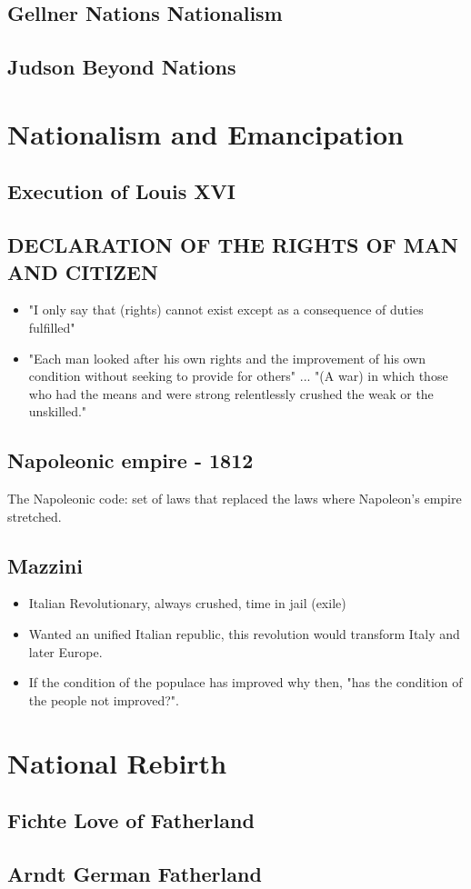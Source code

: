\documentclass[11pt,fleqn]{book} %
\begin{document}
\subsection{Gellner Nations Nationalism}

\subsection{Judson Beyond Nations}

\section{Nationalism and Emancipation}
\subsection{Execution of Louis XVI}
\subsection{DECLARATION OF THE RIGHTS OF MAN AND CITIZEN}
\begin{itemize}
    \item  "I only say that (rights) cannot exist except as a consequence of duties fulfilled"
    \item "Each man looked after his own rights and the improvement of his own condition without seeking to provide for others" ... "(A war) in which those who had the means and were strong relentlessly crushed the weak or the unskilled."
\end{itemize}
\subsection{Napoleonic empire - 1812 }
The Napoleonic code: set of laws that replaced the laws where Napoleon's empire stretched. 
\subsection{Mazzini}
\begin{itemize}
    \item Italian Revolutionary, always crushed, time in jail (exile) 
    \item Wanted an unified Italian republic, this revolution would transform Italy and later Europe.
    \item If the condition of the populace has improved why then, "has the condition of the people not improved?".
\end{itemize}
\section{National Rebirth}
\subsection{Fichte Love of Fatherland}

\subsection{Arndt German Fatherland}
 
\end{document}
